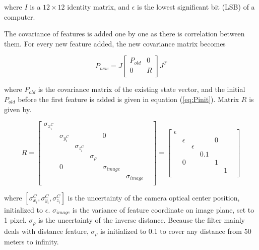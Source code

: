 \noindent where $I$ is a $12\times12$ identity matrix, and $\epsilon $
is the lowest significant bit (LSB) of a computer.

The covariance of features is added one by one as there is 
correlation between them. For every new feature added, the new 
covariance matrix becomes

\begin{equation}
\label{eq:Pnew}
P_{new}=J\begin{bmatrix}
P_{old} & 0 \\
0 & R \\
\end{bmatrix}
J^{T}
\end{equation}

\noindent where $P_{old}$ is the covariance matrix of the existing state vector, 
and the initial $P_{old}$ before the first feature is added is given
in equation (\ref{eq:Pinit}). Matrix $R$ is given by.

\begin{equation}
\label{eq:R}
R=\begin{bmatrix}
\sigma _{x_{i}^{C}} & & & & & & \\
 & \sigma _{y_{i}^{C}} & & & 0 & & \\
 & & \sigma _{z_{i}^{C}} & & & & \\
 & & & \sigma _{\rho } & & & \\
 & 0 & & & \sigma _{image} & & \\
 & & & & & \sigma _{image} & \\
\end{bmatrix}
 = \begin{bmatrix}
\epsilon & & & & & & \\
 & \epsilon & & & 0 & & \\
 & & \epsilon & & & & \\
 & & & 0.1 & & & \\
 & 0 & & & 1 & & \\
 & & & & & 1 & \\
\end{bmatrix} 
\end{equation}

\noindent where $[\sigma_{x_{i}}^{C}, \sigma_{y_{i}}^{C}, \sigma
_{z_{i}}^{C}]$ is the uncertainty of the camera optical center
position, initialized to $\epsilon$. $\sigma_{image}$ is the
variance of feature coordinate on image plane, set to 1 pixel. $\sigma
_{\rho }$ is the uncertainty of the inverse distance. Because the
filter mainly deals with distance feature, $ \sigma _{\rho }$ is
initialized to 0.1 to cover any distance from 50 meters to infinity.

